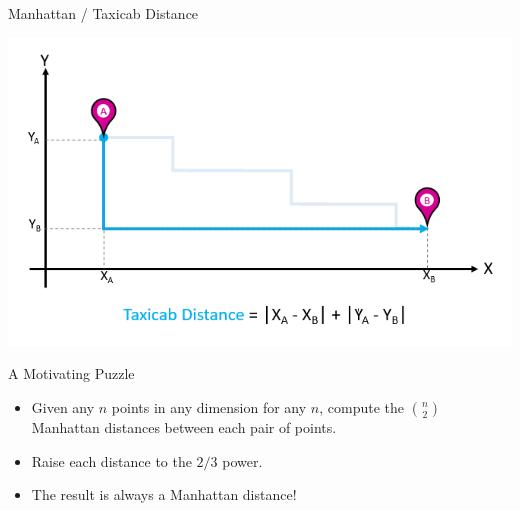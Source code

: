 \begin{frame}{Manhattan / Taxicab Distance}
   \begin{center}
     \includegraphics[width=1\textwidth]{figs/taxicab.png}
   \end{center}
\end{frame}

\begin{frame}{A Motivating Puzzle}
  \begin{itemize} 
    \item <+-> Given any $n$ points in any dimension for any $n$,
      compute the $\binom{n}{2}$ Manhattan distances between each pair
      of points. 
      \vs
    \item <+-> Raise each distance to the $2/3$ power.
      \vs
    \item <+-> The result is always a Manhattan distance! 
  \end{itemize}
\end{frame}


